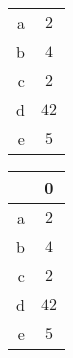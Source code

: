 \begin{table}[htp]
	\begin{center}
		\begin{tabular}{rc}
		\toprule
			{a} & $2$\\
			{b} & $4$\\
			{c} & $2$\\
			{d} & $42$\\
			{e} & $5$\\
		\bottomrule
		\end{tabular}
	\end{center}
\end{table}
\begin{table}[htp]
	\begin{center}
		\begin{tabular}{rc}
		\toprule
			{} & {0}\\
			\midrule
			{a} & $2$\\
			{b} & $4$\\
			{c} & $2$\\
			{d} & $42$\\
			{e} & $5$\\
		\bottomrule
		\end{tabular}
	\end{center}
\end{table}